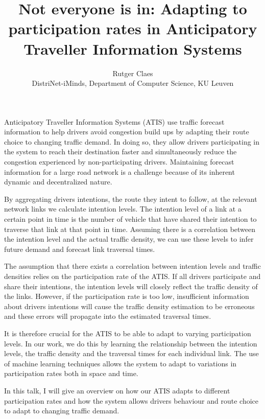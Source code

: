 \documentclass[12pt,a4paper]{article}
\title{\Large Not everyone is in: Adapting to participation rates in Anticipatory Traveller Information Systems}
\author{\normalsize Rutger Claes\\\normalsize DistriNet-iMinds, Department of Computer Science, KU Leuven}
\date{}
\begin{document}
\maketitle
\thispagestyle{empty}

Anticipatory Traveller Information Systems (ATIS) use traffic forecast information to help drivers avoid congestion build ups by adapting their route choice to changing traffic demand. In doing so, they allow drivers participating in the system to reach their destination faster and simultaneously reduce the congestion experienced by non-participating drivers.  Maintaining forecast information for a large road network is a challenge because of its inherent dynamic and decentralized nature.

By aggregating drivers intentions, the route they intent to follow, at the relevant network links we calculate intention levels. The intention level of a link at a certain point in time is the number of vehicle that have shared their intention to traverse that link at that point in time. Assuming there is a correlation between the intention level and the actual traffic density, we can use these levels to infer future demand and forecast link traversal times.

The assumption that there exists a correlation between intention levels and traffic densities relies on the participation rate of the ATIS. If all drivers participate and share their intentions, the intention levels will closely reflect the traffic density of the links. However, if the participation rate is too low, insufficient information about drivers intentions will cause the traffic density estimation to be erroneous and these errors will propagate into the estimated traversal times.

It is therefore crucial for the ATIS to be able to adapt to varying participation levels. In our work, we do this by learning the relationship between the intention levels, the traffic density and the traversal times for each individual link. The use of machine learning techniques allows the system to adapt to variations in participation rates both in space and time.

In this talk, I will give an overview on how our ATIS adapts to different participation rates and how the system allows drivers behaviour and route choice to adapt to changing traffic demand.
\end{document}
